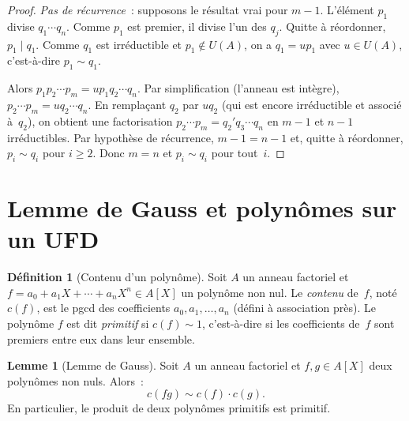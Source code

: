 \documentclass[12pt,a4paper,openany]{book}
\theoremstyle{definition}
\newtheorem{definition}{Définition}[chapter]
\newtheorem{lemme}{Lemme}[chapter]
\begin{document}
\begin{proof}
\emph{Pas de récurrence}~: supposons le résultat vrai pour $m - 1$.
L'élément $p_1$ divise $q_1 \cdots q_n$. Comme $p_1$ est premier, il
divise l'un des $q_j$. Quitte à réordonner, $p_1 \mid q_1$. Comme $q_1$
est irréductible et $p_1 \notin U(A)$, on a $q_1 = u p_1$ avec
$u \in U(A)$, c'est-à-dire $p_1 \sim q_1$.

Alors $p_1 p_2 \cdots p_m = u p_1 q_2 \cdots q_n$. Par simplification
(l'anneau est intègre), $p_2 \cdots p_m = u q_2 \cdots q_n$. En
remplaçant $q_2$ par $uq_2$ (qui est encore irréductible et associé
à~$q_2$), on obtient une factorisation $p_2 \cdots p_m = q_2' q_3
\cdots q_n$ en $m - 1$ et $n - 1$ irréductibles. Par hypothèse de
récurrence, $m - 1 = n - 1$ et, quitte à réordonner,
$p_i \sim q_i$ pour $i \geqslant 2$. Donc $m = n$ et
$p_i \sim q_i$ pour tout~$i$.
\end{proof}

\section{Lemme de Gauss et polynômes sur un UFD}%
\label{sec:gauss}

\begin{definition}[Contenu d'un polynôme]\label{def:contenu}
Soit $A$ un anneau factoriel et $f = a_0 + a_1 X + \cdots + a_n X^n
\in A[X]$ un polynôme non nul. Le \emph{contenu} de~$f$, noté $c(f)$,
est le pgcd des coefficients $a_0, a_1, \ldots, a_n$ (défini à
association près). Le polynôme $f$ est dit \emph{primitif}
si $c(f) \sim 1$, c'est-à-dire si les coefficients de~$f$ sont
premiers entre eux dans leur ensemble.
\end{definition}

\begin{lemme}[Lemme de Gauss]\label{lem:gauss}
Soit $A$ un anneau factoriel et $f, g \in A[X]$ deux polynômes non nuls.
Alors~:
\[
  c(fg) \sim c(f) \cdot c(g).
\]
En particulier, le produit de deux polynômes primitifs est primitif.
\end{lemme}
\end{document}

